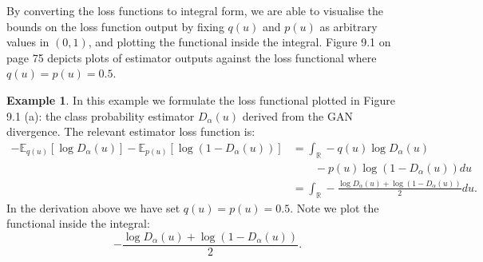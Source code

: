 \documentclass[honours,12pt]{unswthesis}
\newcommand{\R}{\mathbb{R}}
\newcommand{\E}{\mathbb{E}}
\numberwithin{equation}{section}
\theoremstyle{definition}
\newtheorem{example}[theorem]{Example}
\begin{document}
By converting the loss functions to integral form, we are able to visualise the bounds on the loss function output by fixing $q(u)$ and $p(u)$ as arbitrary values in $(0,1)$, and plotting the functional inside the integral. Figure 9.1 on page 75 depicts plots of estimator outputs against the loss functional where $q(u)=p(u)=0.5$.
\begin{example}
In this example we formulate the loss functional plotted in Figure 9.1 (a): the class probability estimator $D_\alpha(u)$ derived from the GAN divergence. The relevant estimator loss function is:
\begin{align*}
-\E_{q(u)}[\log D_\alpha(u)]-\E_{p(u)}[\log (1-D_\alpha(u))]&=\int_\R -q(u)\log D_\alpha(u)\\
&\quad \quad -p(u)\log(1-D_\alpha(u)) du\\
&=\int_\R -\frac{\log D_\alpha(u)+\log(1-D_\alpha(u))}{2}du.
\end{align*}
In the derivation above we have set $q(u)=p(u)=0.5$. Note we plot the functional inside the integral:
\[-\frac{\log D_\alpha(u)+\log(1-D_\alpha(u))}{2}.\]
\end{example}
\end{document}
